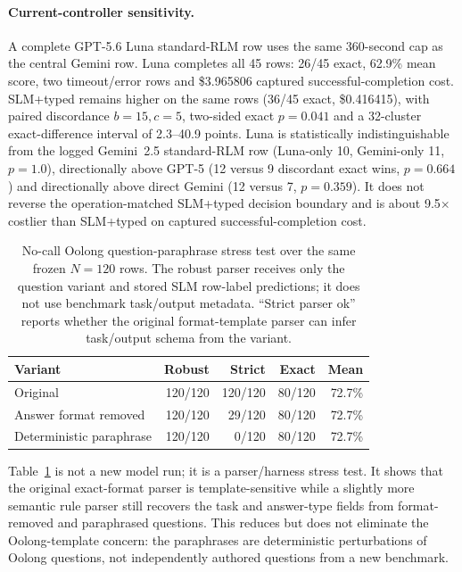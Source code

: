 \paragraph{Current-controller sensitivity.}
A complete GPT-5.6 Luna standard-RLM row uses the same 360-second cap as the central Gemini row. Luna completes all 45 rows: 26/45 exact, 62.9\% mean score, two timeout/error rows and \$3.965806 captured successful-completion cost. SLM+typed remains higher on the same rows (36/45 exact, \$0.416415), with paired discordance $b=15,c=5$, two-sided exact $p=0.041$ and a 32-cluster exact-difference interval of 2.3--40.9 points. Luna is statistically indistinguishable from the logged Gemini~2.5 standard-RLM row (Luna-only 10, Gemini-only 11, $p=1.0$), directionally above GPT-5 (12 versus 9 discordant exact wins, $p=0.664$) and directionally above direct Gemini (12 versus 7, $p=0.359$). It does not reverse the operation-matched SLM+typed decision boundary and is about 9.5$\times$ costlier than SLM+typed on captured successful-completion cost.

\begin{table}[t]
\centering
\small
\setlength{\tabcolsep}{2pt}
\begin{tabular}{@{}p{2.0cm}rrrr@{}}
\toprule
\textbf{Variant} & \textbf{Robust} & \textbf{Strict} & \textbf{Exact} & \textbf{Mean} \\
\midrule
Original & 120/120 & 120/120 & 80/120 & 72.7\% \\
Answer format removed & 120/120 & 29/120 & 80/120 & 72.7\% \\
Deterministic paraphrase & 120/120 & 0/120 & 80/120 & 72.7\% \\
\bottomrule
\end{tabular}
\caption{No-call Oolong question-paraphrase stress test over the same frozen $N=120$ rows. The robust parser receives only the question variant and stored SLM row-label predictions; it does not use benchmark task/output metadata. ``Strict parser ok'' reports whether the original format-template parser can infer task/output schema from the variant.}
\label{tab:supp-oolong-question-stress}
\end{table}

Table~\ref{tab:supp-oolong-question-stress} is not a new model run; it is a parser/harness stress test. It shows that the original exact-format parser is template-sensitive while a slightly more semantic rule parser still recovers the task and answer-type fields from format-removed and paraphrased questions. This reduces but does not eliminate the Oolong-template concern: the paraphrases are deterministic perturbations of Oolong questions, not independently authored questions from a new benchmark.


